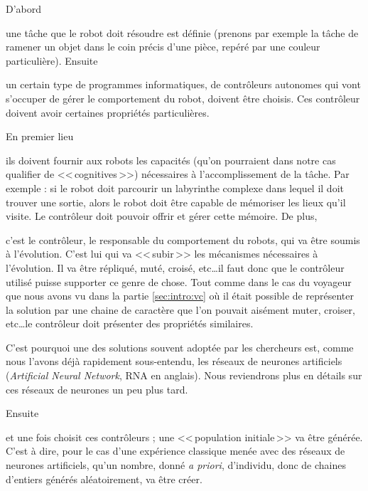 \begin{inparaenum}[(\itshape 1\upshape)]
D'abord \item une tâche que le robot doit résoudre est définie (prenons par exemple la tâche de ramener un objet dans le coin précis d'une pièce, repéré par une couleur particulière). 
Ensuite \item un certain type de programmes informatiques, de contrôleurs autonomes qui vont s'occuper de gérer le comportement du robot, doivent être choisis.
Ces contrôleur doivent avoir certaines propriétés particulières. 
	\begin{inparaenum}
	En premier lieu \item ils doivent fournir aux robots les capacités (qu'on pourraient dans notre cas qualifier de <<\,cognitives\,>>) nécessaires à l'accomplissement de la tâche. Par exemple : si le robot doit parcourir un labyrinthe complexe dans lequel il doit trouver une sortie, alors le robot doit être capable de mémoriser les lieux qu'il visite. Le contrôleur doit pouvoir offrir et gérer cette mémoire. 
		De plus,\item c'est le contrôleur, le responsable du comportement du robots, qui va être soumis à l'évolution. C'est lui qui va <<\,subir\,>> les mécanismes nécessaires à l'évolution. Il va être répliqué, muté, croisé, etc\ldots il faut donc que le contrôleur utilisé puisse supporter ce genre de chose. Tout comme dans le cas du voyageur que nous avons vu dans la partie \ref{sec:intro:vc} où il était possible de représenter la solution par une chaine de caractère que l'on pouvait aisément muter, croiser, etc\ldots le contrôleur doit présenter des propriétés similaires.
	\end{inparaenum} 
	C'est pourquoi une des solutions souvent adoptée par les chercheurs est, comme nous l'avons déjà rapidement sous-entendu, les réseaux de neurones artificiels (\emph{Artificial Neural Network}, RNA en anglais). Nous reviendrons plus en détails sur ces réseaux de neurones un peu plus tard. \label{it:RNA}

Ensuite \item et une fois choisit ces contrôleurs ; une <<\,population initiale\,>> va être générée. C'est à dire, pour le cas d'une expérience classique menée avec des réseaux de neurones artificiels, qu'un nombre, donné \emph{a priori}, d'individu, donc de chaines d'entiers générés aléatoirement, va être créer.


\end{inparaenum}
